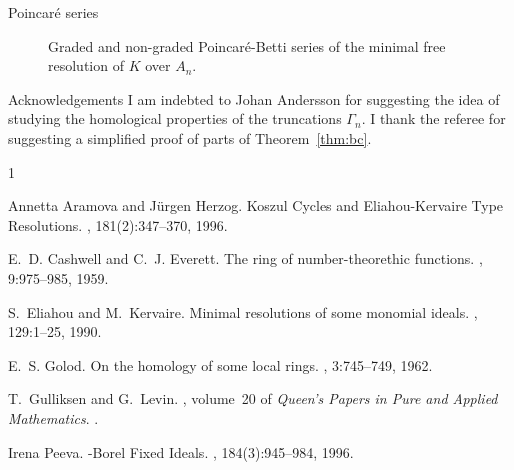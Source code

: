\documentclass[reqno,10pt]{amsart}
\theoremstyle{definition}
\theoremstyle{remark}
\theoremstyle{plain}
\begin{document}
\begin{section}{Poincar{\'e} series}
\begin{figure}[p]
\begin{center}
    \caption{Graded and non-graded Poincar\'e-Betti series of the
  minimal free resolution of \(K\) over \(A_n\).} 
    \label{fig:betti}
  \end{center}
\end{figure}

\end{section}



  \begin{section}{Acknowledgements}
    I am indebted to Johan Andersson for suggesting the idea of studying the
    homological properties of the truncations 
    \(\Gamma_n\). I thank the referee for suggesting a simplified proof of
    parts of 
    Theorem~\ref{thm:bc}. 
  \end{section}



\begin{thebibliography}{1}

Annetta Aramova and J{\"u}rgen Herzog.
\newblock Koszul {C}ycles and {E}liahou-{K}ervaire {T}ype {R}esolutions.
, 181(2):347--370, 1996.

E.~D. Cashwell and C.~J. Everett.
\newblock The ring of number-theorethic functions.
, 9:975--985, 1959.

S.~Eliahou and M.~Kervaire.
\newblock Minimal resolutions of some monomial ideals.
, 129:1--25, 1990.

E.~S. Golod.
\newblock On the homology of some local rings.
, 3:745--749, 1962.

T.~Gulliksen and G.~Levin.
, volume~20 of {\em Queen's {P}apers
  in {P}ure and {A}pplied {M}athematics}.
.

Irena Peeva.
-{B}orel {F}ixed {I}deals.
, 184(3):945--984, 1996.

\end{thebibliography}
\end{document}
